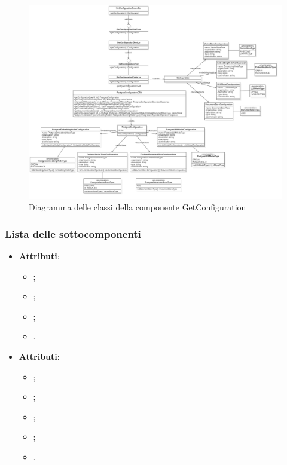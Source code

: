 \documentclass[10pt, a4paper]{article}
\begin{document}
\begin{figure}[H]
    \centering        
    \includegraphics[width=17cm]{img/GetConfiguration.png}
    \caption{Diagramma delle classi della componente GetConfiguration}
\end{figure}


\subsubsection{Lista delle sottocomponenti}

\label{ConfigurationDettaglio}
\begin{itemize}
    \item \textbf{Attributi}:
    \begin{itemize}
        \item {};
        \item {};
        \item {};
        \item {}.
    \end{itemize}
\end{itemize}



\label{DocumentStoreConfigurationDettaglio}
\begin{itemize}
    \item \textbf{Attributi}:
    \begin{itemize}
        \item {};
        \item {};
        \item {};
        \item {};
        \item {}.
    \end{itemize}
\end{itemize}
\end{document}
